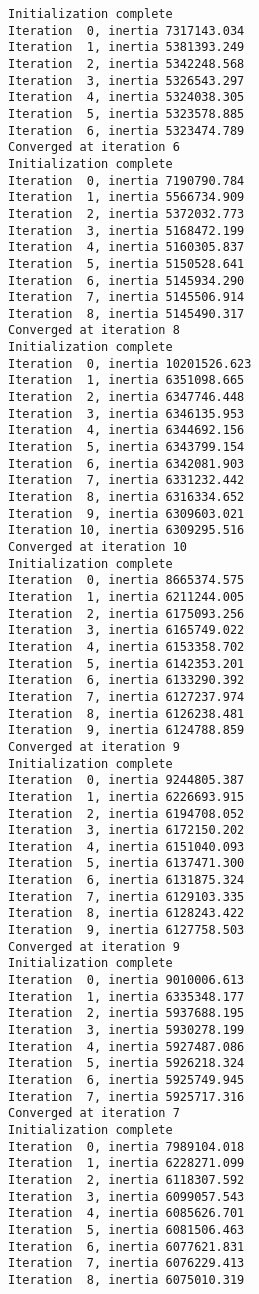 \documentclass{article}
\begin{document}
    \begin{Verbatim}[commandchars=\\\{\}]
Initialization complete
Iteration  0, inertia 7317143.034
Iteration  1, inertia 5381393.249
Iteration  2, inertia 5342248.568
Iteration  3, inertia 5326543.297
Iteration  4, inertia 5324038.305
Iteration  5, inertia 5323578.885
Iteration  6, inertia 5323474.789
Converged at iteration 6
Initialization complete
Iteration  0, inertia 7190790.784
Iteration  1, inertia 5566734.909
Iteration  2, inertia 5372032.773
Iteration  3, inertia 5168472.199
Iteration  4, inertia 5160305.837
Iteration  5, inertia 5150528.641
Iteration  6, inertia 5145934.290
Iteration  7, inertia 5145506.914
Iteration  8, inertia 5145490.317
Converged at iteration 8
Initialization complete
Iteration  0, inertia 10201526.623
Iteration  1, inertia 6351098.665
Iteration  2, inertia 6347746.448
Iteration  3, inertia 6346135.953
Iteration  4, inertia 6344692.156
Iteration  5, inertia 6343799.154
Iteration  6, inertia 6342081.903
Iteration  7, inertia 6331232.442
Iteration  8, inertia 6316334.652
Iteration  9, inertia 6309603.021
Iteration 10, inertia 6309295.516
Converged at iteration 10
Initialization complete
Iteration  0, inertia 8665374.575
Iteration  1, inertia 6211244.005
Iteration  2, inertia 6175093.256
Iteration  3, inertia 6165749.022
Iteration  4, inertia 6153358.702
Iteration  5, inertia 6142353.201
Iteration  6, inertia 6133290.392
Iteration  7, inertia 6127237.974
Iteration  8, inertia 6126238.481
Iteration  9, inertia 6124788.859
Converged at iteration 9
Initialization complete
Iteration  0, inertia 9244805.387
Iteration  1, inertia 6226693.915
Iteration  2, inertia 6194708.052
Iteration  3, inertia 6172150.202
Iteration  4, inertia 6151040.093
Iteration  5, inertia 6137471.300
Iteration  6, inertia 6131875.324
Iteration  7, inertia 6129103.335
Iteration  8, inertia 6128243.422
Iteration  9, inertia 6127758.503
Converged at iteration 9
Initialization complete
Iteration  0, inertia 9010006.613
Iteration  1, inertia 6335348.177
Iteration  2, inertia 5937688.195
Iteration  3, inertia 5930278.199
Iteration  4, inertia 5927487.086
Iteration  5, inertia 5926218.324
Iteration  6, inertia 5925749.945
Iteration  7, inertia 5925717.316
Converged at iteration 7
Initialization complete
Iteration  0, inertia 7989104.018
Iteration  1, inertia 6228271.099
Iteration  2, inertia 6118307.592
Iteration  3, inertia 6099057.543
Iteration  4, inertia 6085626.701
Iteration  5, inertia 6081506.463
Iteration  6, inertia 6077621.831
Iteration  7, inertia 6076229.413
Iteration  8, inertia 6075010.319

\end{Verbatim}
\end{document}
